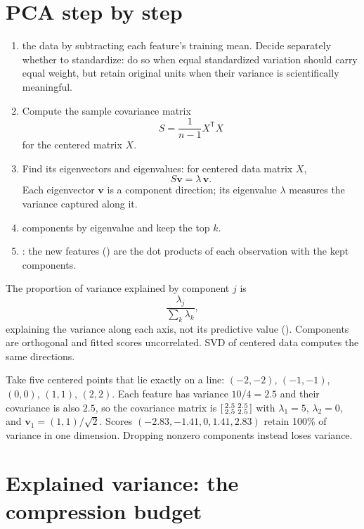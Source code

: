 \section{PCA step by step}

\begin{enumerate}
  \item {} the data by subtracting each feature's training mean. Decide separately whether to standardize: do so when equal standardized variation should carry equal weight, but retain original units when their variance is scientifically meaningful.
  \item Compute the sample covariance matrix
  \[
    S=\frac{1}{n-1}X^{\mathsf T}X
  \]
  for the centered matrix $X$.
  \item Find its eigenvectors and eigenvalues: for centered data matrix $X$,
  \[
    S\bm{v}=\lambda\,\bm{v}.
  \]
  Each eigenvector $\bm{v}$ is a component direction; its eigenvalue $\lambda$ measures the variance captured along it.
  \item {} components by eigenvalue and keep the top $k$.
  \item {}: the new features () are the dot products of each observation with the kept components.
\end{enumerate}

The proportion of variance explained by component $j$ is
\[
  \frac{\lambda_j}{\sum_{k}\lambda_k},
\]
explaining the variance along each axis, not its predictive value (). Components are orthogonal and fitted scores uncorrelated. SVD of centered data computes the same directions.

\begin{workedexample}
Take five centered points that lie exactly on a line: $(-2,-2)$, $(-1,-1)$, $(0,0)$, $(1,1)$, $(2,2)$. Each feature has variance $10/4=2.5$ and their covariance is also $2.5$, so the covariance matrix is
$\begin{bsmallmatrix}2.5 & 2.5\\ 2.5 & 2.5\end{bsmallmatrix}$
with $\lambda_1=5$, $\lambda_2=0$, and $\bm v_1=(1,1)/\sqrt2$. Scores $(-2.83,-1.41,0,1.41,2.83)$ retain 100\% of variance in one dimension. Dropping nonzero components instead loses variance.
\end{workedexample}

\section{Explained variance: the compression budget}

